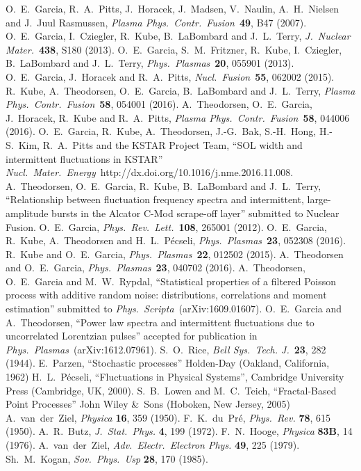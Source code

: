 \documentclass[aps,prb,12pt,a4paper,preprint,amsmath,amssymb,groupedaddress]{revtex4-1}
\newcommand{\JNM}{\textit{J.~Nuclear Mater.}}
\newcommand{\NF}{\textit{Nucl.\ Fusion}}
\newcommand{\PPCF}{\textit{Plasma Phys.\ Contr.\ Fusion}}
\newcommand{\PP}{\textit{Phys.\ Plasmas}}
\newcommand{\PS}{\textit{Phys.\ Scripta}}
\newcommand{\BTSJ}{\textit{Bell Sys.\ Tech. J.}}
\newcommand{\PRL}{\textit{Phys.~Rev.\ Lett.}}
\newcommand{\NME}{\textit{Nucl.~Mater.\ Energy}}
\begin{document}
\begin{thebibliography}{99}
%
O.~E.~Garcia, R.~A.~Pitts, J.~Horacek, J.~Madsen, V.~Naulin, A.~H.~Nielsen and J.~Juul Rasmussen, \PPCF\ {\bf 49}, B47 (2007).
%
O.~E.~Garcia, I.~Cziegler, R.~Kube, B.~La{B}ombard and J.~L.~Terry, \JNM\ {\bf 438}, S180 (2013).
%
O.~E.~Garcia, S.~M.~Fritzner, R.~Kube, I.~Cziegler, B.~La{B}ombard and J.~L.~Terry, \PP\ {\bf 20}, 055901 (2013).
%
O.~E.~Garcia, J.~Horacek and R.~A.~Pitts, \NF\ {\bf 55}, 062002 (2015).
%
R.~Kube, A.~Theodorsen, O.~E.~Garcia, B.~La{B}ombard and J.~L.~Terry, \PPCF\ {\bf 58}, 054001 (2016).
%
A.~Theodorsen, O.~E.~Garcia, J.~Horacek, R.~Kube and R.~A.~Pitts, \PPCF\ {\bf 58}, 044006 (2016).
%
O.~E.~Garcia, R.~Kube, A.~Theodorsen, J.-G.~Bak, S.-H.~Hong, H.-S.~Kim, R.~A.~Pitts and the KSTAR Project Team, ``SOL width and intermittent fluctuations in KSTAR'' \NME\ http://dx.doi.org/10.1016/j.nme.2016.11.008.
%
A.~Theodorsen, O.~E.~Garcia, R.~Kube, B.~La{B}ombard and J.~L.~Terry, ``Relationship between fluctuation frequency spectra and intermittent, large-amplitude bursts in the Alcator C-Mod scrape-off layer'' submitted to Nuclear Fusion.
%
%
O.~E.~Garcia, \PRL\ {\bf 108}, 265001 (2012).
%
O.~E.~Garcia, R.~Kube, A.~Theodorsen and H.~L.~P{\'e}cseli, \PP\ {\bf 23}, 052308 (2016).
%
R.~Kube and O.~E.~Garcia, \PP\ {\bf 22}, 012502 (2015).
%
A.~Theodorsen and O.~E.~Garcia, \PP\ {\bf 23}, 040702 (2016).
%
A.~Theodorsen, O.~E.~Garcia and M.~W.~Rypdal, ``Statistical properties of a filtered Poisson process with additive random noise: distributions, correlations and moment estimation'' submitted to \PS\ (arXiv:1609.01607).
%
O.~E.~Garcia and A.~Theodorsen, ``Power law spectra and intermittent fluctuations due to uncorrelated Lorentzian pulses'' accepted for publication in \PP\ (arXiv:1612.07961).
%
S.~O.~Rice, \BTSJ\ {\bf 23}, 282 (1944). %
%
E.~Parzen, ``Stochastic processes'' Holden-Day (Oakland, California, 1962)
%
H.~L.~P{\'e}cseli, ``Fluctuations in Physical Systems'', Cambridge University Press (Cambridge, UK, 2000).
%
S.~B.~Lowen and M.~C.~Teich, ``Fractal-Based Point Processes'' John Wiley \&\ Sons (Hoboken, New Jersey, 2005)
%
A.~van~der~Ziel, \textit{Physica} {\bf 16}, 359 (1950).
%
F.~K.~du~Pr{\'e}, \textit{Phys.\ Rev.} {\bf 78}, 615 (1950).
%
A.~R.~Butz, \textit{J.~Stat.~Phys.} {\bf 4}, 199 (1972).
%
F.~N.~Hooge, \textit{Physica} {\bf 83B}, 14 (1976).
%
A.~van~der~Ziel, \textit{Adv.\ Electr.\ Electron Phys.} {\bf 49}, 225 (1979).
%
Sh.~M.~Kogan, \textit{Sov.~Phys.~Usp} {\bf 28}, 170 (1985).
%
\end{thebibliography}
\end{document}
